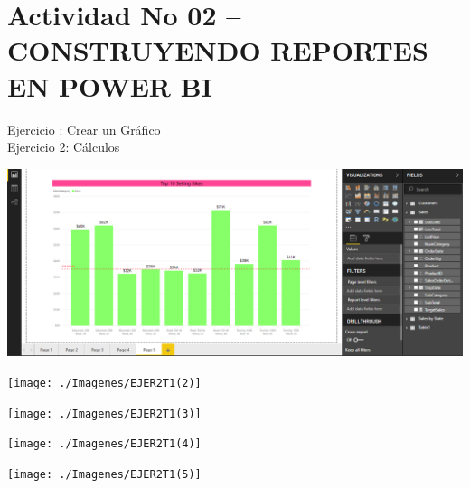 \section{Actividad No 02 – CONSTRUYENDO REPORTES EN POWER BI} 

Ejercicio :  Crear un Gráfico \\
Ejercicio 2: Cálculos \\

	\begin{center}
	\includegraphics[width=18cm]{./Imagenes/Imagen12}
	\end{center}	

	\begin{center}
	\texttt{[image: ./Imagenes/EJER2T1(2)]}
	\end{center}	

	\begin{center}
	\texttt{[image: ./Imagenes/EJER2T1(3)]}
	\end{center}	

	\begin{center}
	\texttt{[image: ./Imagenes/EJER2T1(4)]}
	\end{center}	
\newpage
	\begin{center}
	\texttt{[image: ./Imagenes/EJER2T1(5)]}
	\end{center}	

	
